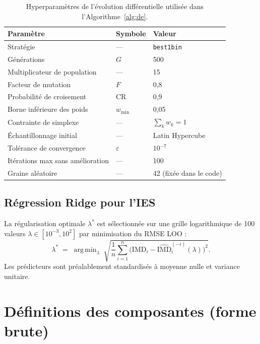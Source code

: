 \documentclass[11pt,a4paper]{article}
\newcommand{\IMD}{\mathrm{IMD}}
\DeclareMathOperator*{\argmin}{arg\,min}
\begin{document}
\begin{table}[H]
\centering
\caption{Hyperparamètres de l'évolution différentielle utilisée
dans l'Algorithme~\ref{alg:de}.}
\label{tab:de-hyper}
\small
\begin{tabular}{@{}lll@{}}
\toprule
\textbf{Paramètre} & \textbf{Symbole} & \textbf{Valeur} \\
\midrule
Stratégie & --- & \texttt{best1bin} \\
Générations & $G$ & 500 \\
Multiplicateur de population & --- & 15 \\
Facteur de mutation & $F$ & 0,8 \\
Probabilité de croisement & $\mathrm{CR}$ & 0,9 \\
Borne inférieure des poids & $w_{\min}$ & 0,05 \\
Contrainte de simplexe & --- & $\sum_k w_k = 1$ \\
Échantillonnage initial & --- & Latin Hypercube \\
Tolérance de convergence & $\varepsilon$ & $10^{-7}$ \\
Itérations max sans amélioration & --- & 100 \\
Graine aléatoire & --- & 42 (fixée dans le code) \\
\bottomrule
\end{tabular}
\end{table}

\subsection{Régression Ridge pour l'IES}

La régularisation optimale $\lambda^{\ast}$ est sélectionnée sur
une grille logarithmique de 100 valeurs
$\lambda \in [10^{-3}, 10^{2}]$ par minimisation du RMSE LOO :
\begin{equation*}
    \lambda^{\ast} \;=\;
    \argmin_{\lambda}\;\sqrt{
    \frac{1}{n}\sum_{i=1}^{n}
    \bigl(\IMD_i - \widehat{\IMD}_i^{(-i)}(\lambda)\bigr)^2 }.
\end{equation*}
Les prédicteurs sont préalablement standardisés à moyenne nulle
et variance unitaire.

\section{Définitions des composantes (forme brute)}
\label{app:components}
\end{document}
